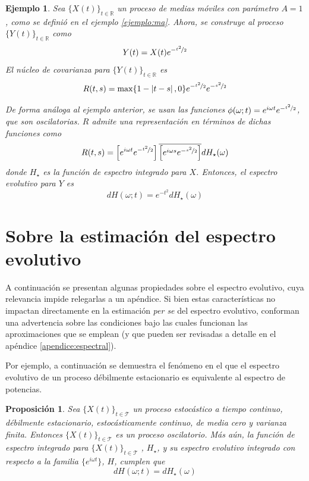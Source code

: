 \documentclass[12pt,letterpaper]{book}
\newtheorem{proposicion}[teorema]{Proposición}
\newtheorem{ejemplo}{Ejemplo}[chapter]
\newcommand{\R}{\mathbb{R}}
\newcommand{\abso}[1]{\left| #1 \right|}
\newcommand{\xt}{$\{X(t)\}_{t\in \mathcal{T}}$ }
\newcommand{\xtin}[1]{$\{X(t)\}_{t\in \mathcal{ #1 }}$ }
\begin{document}
\begin{ejemplo}
\label{ejemplo:lazy2}
Sea \xtin{\R} un proceso de medias móviles con parámetro $A=1$, como se definió en el ejemplo \ref{ejemplo:ma}. 
%
Ahora, se construye al proceso $\{Y(t)\}_{t\in\R}$ como
\begin{equation}
Y(t) = X(t) e^{-\nicefrac{t^2}{2}}
\end{equation}
%
El núcleo de covarianza para $\{Y(t)\}_{t\in\R}$ es
\begin{equation}
R(t,s) = \max\{ 1 - \abso{t-s} , 0 \} e^{-\nicefrac{t^2}{2}} e^{-\nicefrac{s^2}{2}}
\end{equation}

\newpage
De forma análoga al ejemplo anterior, se usan las funciones $\phi(\omega; t) = e^{i \omega t} e^{-\nicefrac{t^2}{2}}$, que son oscilatorias. $R$ admite una representación en términos de dichas funciones como
\begin{equation}
R(t,s) = \left[e^{i \omega t} e^{-\nicefrac{t^2}{2}} \right] \overline{\left[ e^{i \omega s} e^{-\nicefrac{s^2}{2}} \right]}  dH_\star(\omega)
\end{equation}
donde $H_\star$ es la función de espectro integrado para $X$. Entonces, el espectro evolutivo para 
$Y$ es
\begin{equation}
dH(\omega;t) = e^{-{t^2}} dH_\star(\omega)
\end{equation}
\end{ejemplo}

\section{Sobre la estimación del espectro evolutivo}

A continuación se presentan algunas propiedades sobre el espectro evolutivo, cuya relevancia impide relegarlas a un apéndice.
%
Si bien estas características no impactan directamente en la estimación \textit{per se} del espectro evolutivo, conforman una advertencia sobre las condiciones bajo las cuales funcionan las aproximaciones que se emplean (y que pueden ser revisadas a detalle en el apéndice \ref{apendice:espectral}).

Por ejemplo, a continuación se demuestra el fenómeno en el que el espectro evolutivo de un proceso débilmente estacionario es equivalente al espectro de potencias.

\begin{proposicion}
\label{lazy:redux}
\label{lazy11}
Sea \xt un proceso estocástico a tiempo continuo, débilmente estacionario, estocásticamente continuo, de media cero y varianza finita.
%
Entonces \xt es un proceso oscilatorio.
%
Más aún, la función de espectro integrado para \xt, $H_\star$, y su espectro evolutivo integrado con respecto a la familia $\{ e^{i \omega t} \}$, $H$, cumplen que
\begin{equation}
dH(\omega; t) = dH_\star(\omega)
\end{equation}
\end{proposicion}
\end{document}
